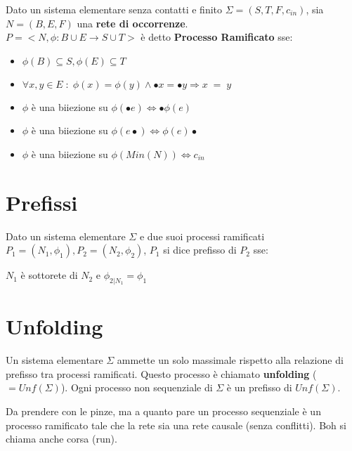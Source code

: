 Dato un sistema elementare senza contatti e finito $\Sigma = (S, T, F, c_{in})$, sia $N = (B, E, F)$ una \textbf{rete di occorrenze}. \\

$P = <N, \phi : B \cup E \rightarrow S \cup T>$ \`e detto \textbf{Processo Ramificato} sse:

\begin{itemize}
    \item $\phi(B) \subseteq S, \phi(E) \subseteq T$
    \item $\forall x,y \in E \; : \; \phi(x) = \phi(y) \land \bullet x = \bullet y \Rightarrow x \; = \; y$
    \item $\phi$ \`e una biiezione su $\phi(\bullet e) \Leftrightarrow \bullet \phi(e)$ 
    \item $\phi$ \`e una biiezione su $\phi(e \bullet) \Leftrightarrow \phi(e) \bullet$ 
    \item $\phi$ \`e una biiezione su $\phi(Min(N)) \Leftrightarrow c_{in}$ 
\end{itemize}


\section{Prefissi}

Dato un sistema elementare $\Sigma$ e due suoi processi ramificati $P_1 = (N_1, \phi_1), P_2 = (N_2, \phi_2)$, $P_1$ si dice prefisso di $P_2$ sse:

$N_1$ \`e sottorete di $N_2$ e $\phi_{2|N_1} = \phi_1$

\section{Unfolding}

Un sistema elementare $\Sigma$ ammette un solo massimale rispetto alla relazione di prefisso tra processi ramificati. Questo processo \`e chiamato \textbf{unfolding} ($= Unf(\Sigma)$).
Ogni processo non sequenziale di $\Sigma$ \`e un prefisso di $Unf(\Sigma)$.

Da prendere con le pinze, ma a quanto pare un processo sequenziale \`e un processo ramificato tale che la rete sia una rete causale (senza conflitti).
Boh si chiama anche corsa (run).

